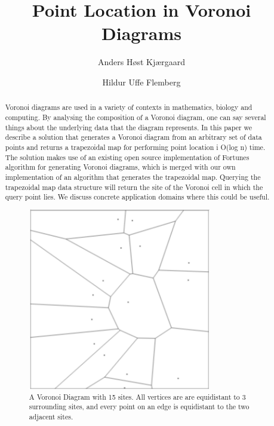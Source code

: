 \documentclass[oribibl]{llncs}
\begin{document}

\mainmatter              %
\title{Point Location in Voronoi Diagrams}

\author{Anders Høst Kjærgaard \and Hildur Uffe Flemberg\\
}


\maketitle              %

\begin{abstract}
Voronoi diagrams are used in a variety of contexts in mathematics, biology and computing. By analysing the composition of a Voronoi diagram, one can say several things about the underlying data that the diagram represents. In this paper we describe a solution that generates a Voronoi diagram from an arbitrary set of data points and returns a trapezoidal map for performing point location i O(log n) time. The solution makes use of an existing open source implementation of Fortunes algorithm for generating Voronoi diagrams, which is merged with our own implementation of an algorithm that generates the trapezoidal map. Querying the trapezoidal map data structure will return the site of the Voronoi cell in which the query point lies. We discuss concrete application domains where this could be useful.

\begin{figure}[t]
    \centering
      \includegraphics[width=80mm]{images/voronoi_diagram.pdf}
    \caption{A Voronoi Diagram with 15 sites. All vertices are are equidistant to 3 surrounding sites, and every point on an edge is equidistant
    to the two adjacent sites. }
    \label{fig:Pipes2IFCWorkflow}
\end{figure}


\end{abstract}











\end{document}
